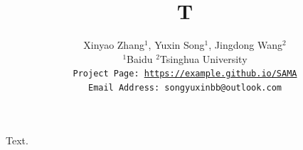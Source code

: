 \documentclass{article}
\title{T}
\author{%
  Xinyao Zhang$^{1}$, Yuxin Song$^{1}$, Jingdong Wang$^{2}$ \\
  $^1$Baidu \quad $^2$Tsinghua University \\
  \tt\small {Project Page: \url{https://example.github.io/SAMA}} \\
  \tt\small {Email Address: songyuxinbb@outlook.com} \\
}
\begin{document}
\maketitle
Text.
\end{document}
